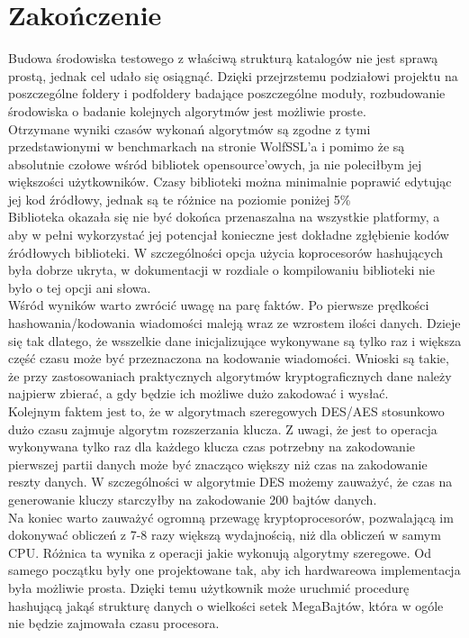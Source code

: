 \documentclass[oneside]{mgr}
\begin{document}
\chapter{Zakończenie}
Budowa środowiska testowego z właściwą strukturą katalogów nie jest sprawą prostą, jednak cel udało się osiągnąć. Dzięki przejrzstemu podziałowi projektu na poszczególne foldery i podfoldery badające poszczególne moduły, rozbudowanie środowiska o badanie kolejnych algorytmów jest możliwie proste.\\
Otrzymane wyniki czasów wykonań algorytmów są zgodne z tymi przedstawionymi w benchmarkach na stronie WolfSSL'a i pomimo że są absolutnie czołowe wśród bibliotek opensource'owych, ja nie poleciłbym jej większości użytkowników. Czasy biblioteki można minimalnie poprawić edytując jej kod źródłowy, jednak są te różnice na poziomie poniżej 5\%\\
Biblioteka okazała się nie być dokońca przenaszalna na wszystkie platformy, a aby w pełni wykorzystać jej potencjał konieczne jest dokładne zgłębienie kodów źródłowych biblioteki. W szczególności opcja użycia koprocesorów hashujących była dobrze ukryta, w dokumentacji w rozdiale o kompilowaniu biblioteki nie było o tej opcji ani słowa.\\
Wśród wyników warto zwrócić uwagę na parę faktów. Po pierwsze prędkości hashowania/kodowania wiadomości maleją wraz ze wzrostem ilości danych. Dzieje się tak dlatego, że wsszelkie dane inicjalizujące wykonywane są tylko raz i większa część czasu może być przeznaczona na kodowanie wiadomości. Wnioski są takie, że przy zastosowaniach praktycznych algorytmów kryptograficznych dane należy najpierw zbierać, a gdy będzie ich możliwe dużo zakodować i wysłać.\\
Kolejnym faktem jest to, że w algorytmach szeregowych DES/AES stosunkowo dużo czasu zajmuje algorytm rozszerzania klucza. Z uwagi, że  jest to operacja wykonywana tylko raz dla każdego klucza czas potrzebny na zakodowanie pierwszej partii danych może być znacząco większy niż czas na zakodowanie reszty danych. W szczególności w algorytmie DES możemy zauważyć, że czas na generowanie kluczy starczyłby na zakodowanie 200 bajtów danych.\\
Na koniec warto zauważyć ogromną przewagę kryptoprocesorów, pozwalającą im dokonywać obliczeń z 7-8 razy większą wydajnością, niż dla obliczeń w samym CPU. Różnica ta wynika z operacji jakie wykonują algorytmy szeregowe. Od samego początku były one projektowane tak, aby ich hardwareowa implementacja była możliwie prosta. Dzięki temu użytkownik może uruchmić procedurę hashującą jakąś strukturę danych o wielkości setek MegaBajtów, która w ogóle nie będzie zajmowała czasu procesora.
\appendix
\end{document}
